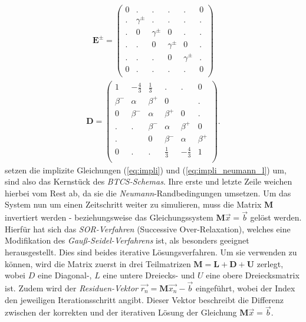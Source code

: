 \documentclass[12pt,a4paper,titlepage,headinclude,bibtotoc]{scrartcl}
\begin{document}
\begin{align*}
\boldsymbol{E^\pm} = \begin{pmatrix}
	0 & . & .& .& .& 0\\
	. & \gamma^\pm & . & . & . & .\\
	. & 0 & \gamma^\pm & 0 & . & .\\
	. & . & 0 & \gamma^\pm & 0  & .\\  
	. & . & . & 0 &  \gamma^\pm & .\\ 
	0 & . & .& .& .& 0\\
 \end{pmatrix}
\end{align*}
\begin{align*}
 \boldsymbol{D} = \begin{pmatrix}
	1 & -\frac{4}{3} & \frac{1}{3} & .& .& 0\\
	\beta^- & \alpha & \beta^+ & 0 &  & .\\ 
	0 & \beta^- & \alpha & \beta^+ & 0 & .\\ 
	. & . & \beta^- & \alpha & \beta^+ & 0\\ 
	. &   & 0 & \beta^- & \alpha & \beta^+\\ 
	0 & . & .& \frac{1}{3} & -\frac{4}{3} & 1\\
 \end{pmatrix}.
 \end{align*}
 setzen die implizite Gleichungen (\ref{eq:impli}) und (\ref{eq:impli_neumann_l}) um, sind also das Kernstück des \textit{BTCS-Schemas}. Ihre erste und letzte Zeile weichen hierbei vom Rest ab, da sie die \textit{Neumann}-Randbedingungen umsetzen.
Um das System nun um einen Zeitschritt weiter zu simulieren, muss die Matrix $\textbf{M}$ invertiert werden - beziehungsweise das Gleichungssystem $\textbf{M} \vec{x} = \vec{b}$ gelöst werden.\\
Hierfür hat sich das \textit{SOR-Verfahren} (Successive Over-Relaxation), welches eine Modifikation des \textit{Gauß-Seidel-Verfahrens} ist, als besonders geeignet herausgestellt. Dies sind beides iterative Lösungsverfahren. Um sie verwenden zu können, wird die Matrix zuerst in drei Teilmatrizen $\boldsymbol{M}=\boldsymbol{L}+\boldsymbol{D}+\boldsymbol{U}$ zerlegt, wobei $D$ eine Diagonal-, $L$ eine untere Dreiecks- und $U$ eine obere Dreiecksmatrix ist. Zudem wird der \textit{Residuen-Vektor} $\vec{r_n} = \boldsymbol{M} \vec{x_n} - \vec{b}$ eingeführt, wobei der Index den jeweiligen Iterationsschritt angibt. Dieser Vektor beschreibt die Differenz zwischen der korrekten und der iterativen Lösung der Gleichung $\boldsymbol{M} \vec{x} = \vec{b}$.\\
\end{document}
